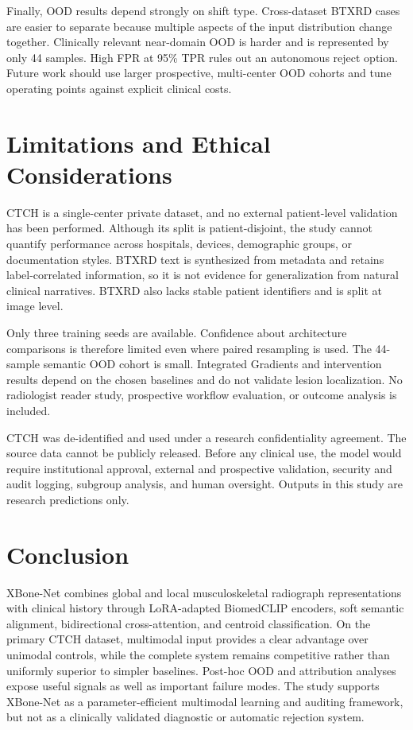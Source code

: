 \documentclass[runningheads]{llncs}
\begin{document}
Finally, OOD results depend strongly on shift type. Cross-dataset BTXRD cases are easier to separate because multiple aspects of the input distribution change together. Clinically relevant near-domain OOD is harder and is represented by only 44 samples. High FPR at 95\% TPR rules out an autonomous reject option. Future work should use larger prospective, multi-center OOD cohorts and tune operating points against explicit clinical costs.

\section{Limitations and Ethical Considerations}

CTCH is a single-center private dataset, and no external patient-level validation has been performed. Although its split is patient-disjoint, the study cannot quantify performance across hospitals, devices, demographic groups, or documentation styles. BTXRD text is synthesized from metadata and retains label-correlated information, so it is not evidence for generalization from natural clinical narratives. BTXRD also lacks stable patient identifiers and is split at image level.

Only three training seeds are available. Confidence about architecture comparisons is therefore limited even where paired resampling is used. The 44-sample semantic OOD cohort is small. Integrated Gradients and intervention results depend on the chosen baselines and do not validate lesion localization. No radiologist reader study, prospective workflow evaluation, or outcome analysis is included.

CTCH was de-identified and used under a research confidentiality agreement. The source data cannot be publicly released. Before any clinical use, the model would require institutional approval, external and prospective validation, security and audit logging, subgroup analysis, and human oversight. Outputs in this study are research predictions only.

\section{Conclusion}

XBone-Net combines global and local musculoskeletal radiograph representations with clinical history through LoRA-adapted BiomedCLIP encoders, soft semantic alignment, bidirectional cross-attention, and centroid classification. On the primary CTCH dataset, multimodal input provides a clear advantage over unimodal controls, while the complete system remains competitive rather than uniformly superior to simpler baselines. Post-hoc OOD and attribution analyses expose useful signals as well as important failure modes. The study supports XBone-Net as a parameter-efficient multimodal learning and auditing framework, but not as a clinically validated diagnostic or automatic rejection system.
\end{document}
